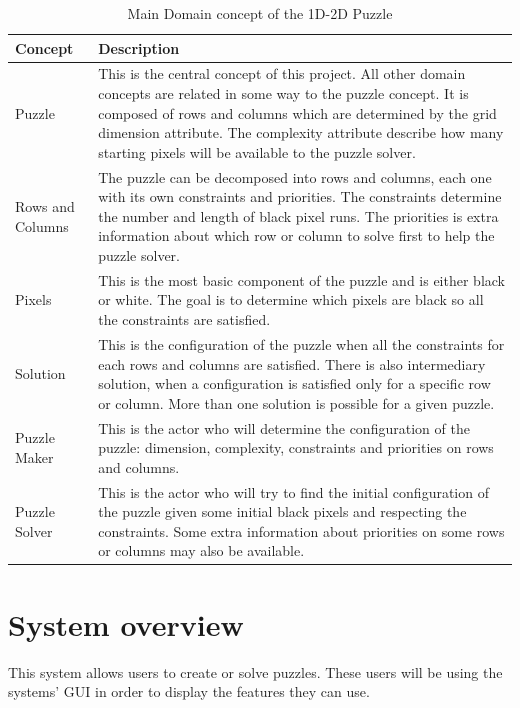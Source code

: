 \documentclass[12pt]{article}
\begin{document}
\begin{table}[H]
\caption{Main Domain concept of the 1D-2D Puzzle}
\begin{center}
\begin{tabularx}{\textwidth}{|p{1.75cm} | X|}
\hline
\bf Concept & \bf Description \\
\hline
Puzzle & This is the central concept of this project. All other domain concepts are related in some way to the puzzle concept. It is composed of rows and columns which are determined by the grid dimension attribute.
The complexity attribute describe how many starting pixels will be available to the puzzle solver. \\
\hline
Rows and Columns & The puzzle can be decomposed into rows and columns, each one with its own constraints and priorities. The constraints determine the number and length of black pixel runs. The priorities is extra
information about which row or column to solve first to help the puzzle solver.\\
\hline
Pixels & This is the most basic component of the puzzle and is either black or white. The goal is to determine which pixels are black so all the constraints are satisfied. \\
\hline
Solution & This is the configuration of the puzzle when all the constraints for each rows and columns are satisfied. There is also intermediary solution, when a configuration is satisfied only for a specific 
row or column. More than one solution is possible for a given puzzle. \\
\hline
Puzzle Maker & This is the actor who will determine the configuration of the puzzle: dimension, complexity, constraints and priorities on rows and columns. \\
\hline
Puzzle Solver & This is the actor who will try to find the initial configuration of the puzzle given some initial black pixels and respecting the constraints. Some extra information about priorities 
on some rows or columns may also be available. \\
\hline
\end{tabularx}
\end{center}
\end{table}

\section{System overview}
\setlength{\parindent}{5ex}
 
 
This system allows users to create or solve puzzles. These users will be using the systems' GUI in order to display the features they can use.
\end{document}
